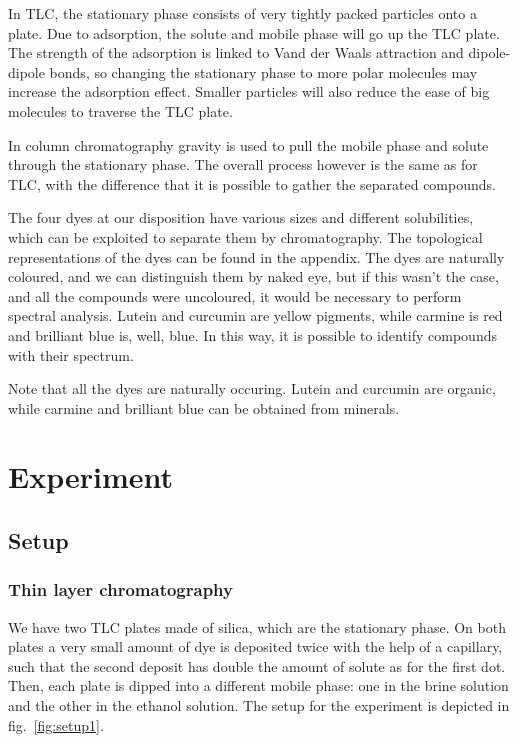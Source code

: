 \documentclass{article}
\begin{document}
In TLC, the stationary phase consists of very tightly packed particles onto a plate. Due to adsorption, the solute and mobile phase will go up the TLC plate. The strength of the adsorption is linked to Vand der Waals attraction and dipole-dipole bonds, so changing the stationary phase to more polar molecules may increase the adsorption effect. Smaller particles will also reduce the ease of big molecules to traverse the TLC plate. 

In column chromatography gravity is used to pull the mobile phase and solute through the stationary phase. The overall process however is the same as for TLC, with the difference that it is possible to gather the separated compounds.

The four dyes at our disposition have various sizes and different solubilities, which can be exploited to separate them by chromatography. The topological representations of the dyes can be found in the appendix. The dyes are naturally coloured, and we can distinguish them by naked eye, but if this wasn't the case, and all the compounds were uncoloured, it would be necessary to perform spectral analysis. Lutein and curcumin are yellow pigments, while carmine is red and brilliant blue is, well, blue. In this way, it is possible to identify compounds with their spectrum.

Note that all the dyes are naturally occuring. Lutein and curcumin are organic, while carmine and brilliant blue can be obtained from minerals. 
\section{Experiment}

\subsection{Setup}

\subsubsection{Thin layer chromatography}

We have two TLC plates made of silica, which are the stationary phase. On both plates a very small amount of dye is deposited twice with the help of a capillary, such that the second deposit has double the amount of solute as for the first dot. Then, each plate is dipped into a different mobile phase: one in the brine solution and the other in the ethanol solution. The setup for the experiment is depicted in fig.~\ref{fig:setup1}.
\end{document}
